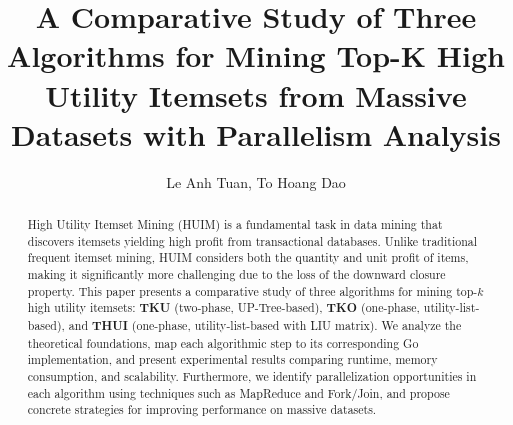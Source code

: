 \documentclass[runningheads]{llncs}
\begin{document}
\title{A Comparative Study of Three Algorithms for Mining Top-K High Utility Itemsets from Massive Datasets with Parallelism Analysis}


\author{Le Anh Tuan, To Hoang Dao}



\maketitle

\begin{abstract}
High Utility Itemset Mining (HUIM) is a fundamental task in data mining that discovers itemsets yielding high profit from transactional databases. Unlike traditional frequent itemset mining, HUIM considers both the quantity and unit profit of items, making it significantly more challenging due to the loss of the downward closure property. This paper presents a comparative study of three algorithms for mining top-$k$ high utility itemsets: \textbf{TKU} (two-phase, UP-Tree-based), \textbf{TKO} (one-phase, utility-list-based), and \textbf{THUI} (one-phase, utility-list-based with LIU matrix). We analyze the theoretical foundations, map each algorithmic step to its corresponding Go implementation, and present experimental results comparing runtime, memory consumption, and scalability. Furthermore, we identify parallelization opportunities in each algorithm using techniques such as MapReduce and Fork/Join, and propose concrete strategies for improving performance on massive datasets.

\end{abstract}












\end{document}
